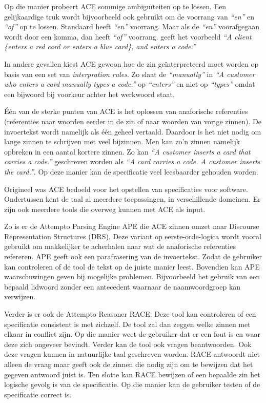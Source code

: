 \documentclass[]{article}
\newcommand{\example}[1]{\textit{``#1''}}
\begin{document}
Op die manier probeert ACE sommige ambiguïteiten op te lossen. Een gelijkaardige truk wordt bijvoorbeeld ook gebruikt om de voorrang van \example{en} en \example{of} op te lossen. Standaard heeft \example{en} voorrang. Maar als de \example{en} voorafgegaan wordt door een komma, dan heeft \example{of} voorrang. \cite{ACEConstructionRules} geeft het voorbeeld \example{A client \{enters a red card or enters a blue card\}, and enters a code.}

In andere gevallen kiest ACE gewoon hoe de zin geïnterpreteerd moet worden op basis van een set van \textit{interpration rules}. Zo slaat de \example{manually} in \example{A customer who {enters a card manually} types a code.}\cite{ACEConstructionRules} op \example{enters} en niet op \example{types} omdat een bijwoord bij voorkeur achter het werkwoord staat.

Één van de sterke punten van ACE is het oplossen van anaforische referenties (referenties naar woorden eerder in de zin of naar woorden van vorige zinnen). De invoertekst wordt namelijk als één geheel vertaald. Daardoor is het niet nodig om lange zinnen te schrijven met veel bijzinnen. Men kan zo'n zinnen namelijk opbreken in een aantal kortere zinnen. Zo kan \example{A customer inserts a card that carries a code.} geschreven worden als \example{A card carries a code. A customer inserts the card.}\cite{Fuchs2008}. Op deze manier kan de specificatie veel leesbaarder gehouden worden.

Origineel was ACE bedoeld voor het opstellen van specificaties voor software. Ondertussen kent de taal al meerdere toepassingen, in verschillende domeinen. Er zijn ook meerdere tools die overweg kunnen met ACE als input.

Zo is er de Attempto Parsing Engine APE die ACE zinnen omzet naar Discourse Representation Structures (DRS). Deze variant op eerste-orde-logica wordt vooral gebruikt om makkelijker te acherhalen naar wat de anaforische referenties refereren. APE geeft ook een parafrasering van de invoertekst. Zodat de gebruiker kan controleren of de tool de tekst op de juiste manier leest. Bovendien kan APE waarschuwingen geven bij mogelijke problemen. Bijvoorbeeld het gebruik van een bepaald lidwoord zonder een antecedent waarnaar de naamwoordgroep kan verwijzen.

Verder is er ook de Attempto Reasoner RACE. Deze tool kan controleren of een specificatie consistent is met zichzelf. De tool zal dan zeggen welke zinnen met elkaar in conflict zijn. Op die manier weet de gebruiker dat er een fout is en waar deze zich ongeveer bevindt. Verder kan de tool ook vragen beantwoorden. Ook deze vragen kunnen in natuurlijke taal geschreven worden. RACE antwoordt niet alleen de vraag maar geeft ook de zinnen die nodig zijn om te bewijzen dat het gegeven antwoord juist is. Ten slotte kan RACE bewijzen of een bepaalde zin het logische gevolg is van de specificatie. Op die manier kan de gebruiker testen of de specificatie correct is.
\end{document}
